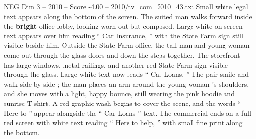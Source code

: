 \begin{textsample}{NEG Dim 3 – 2010 – Score -4.00 – 2010/tv\_com\_2010\_43.txt}
Small white legal text appears along the bottom of the screen.
The suited man walks forward inside the \textbf{bright} office lobby, looking worn out but composed.
Large white on-screen text appears over him reading “ Car Insurance, ” with the State Farm sign still visible beside him.
Outside the State Farm office, the tall man and young woman come out through the glass doors and down the steps together.
The storefront has large windows, metal railings, and another red State Farm sign visible through the glass.
Large white text now reads “ Car Loans. ” The pair smile and walk side by side ; the man places an arm around the young woman ’s shoulders, and she moves with a light, happy bounce, still wearing the pink hoodie and sunrise T-shirt.
A red graphic wash begins to cover the scene, and the words “ Here to ” appear alongside the “ Car Loans ” text.
The commercial ends on a full red screen with white text reading “ Here to help, ” with small fine print along the bottom.

\end{textsample}
